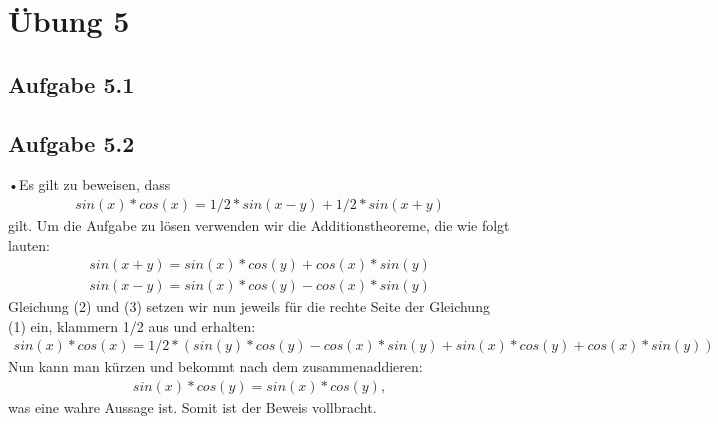 \documentclass{standalone}
\begin{document}
    
\section{Übung 5}

\subsection{Aufgabe 5.1}

\subsection{Aufgabe 5.2}
•Es gilt zu beweisen, dass 
\begin{align}
sin(x)*cos(x)= 1/2*sin(x-y)+1/2*sin(x+y)
\end{align}
gilt. Um die Aufgabe zu lösen verwenden wir die Additionstheoreme, die wie folgt lauten:
\begin{align}
sin(x+y)=sin(x)*cos(y)+cos(x)*sin(y)
\end{align}
\begin{align}
sin(x-y)=sin(x)*cos(y)-cos(x)*sin(y)
\end{align}
Gleichung (2) und (3) setzen wir nun jeweils für die rechte Seite der Gleichung (1) ein, klammern 1/2 aus und erhalten: 
\begin{align}
sin(x)*cos(x)= 1/2*(sin(y)*cos(y)-cos(x)*sin(y)+sin(x)*cos(y)+cos(x)*sin(y))
\end{align} 
Nun kann man kürzen und bekommt nach dem zusammenaddieren:
\begin{align}
sin(x)*cos(y)=sin(x)*cos(y),
\end{align}
was eine wahre Aussage ist. Somit ist der Beweis vollbracht.
\end{document}

